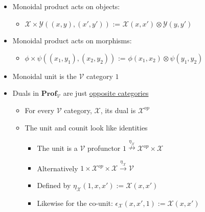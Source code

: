 \begin{itemize}
    \item Monoidal product acts on objects:
          \begin{itemize}
            \item $\mathcal{X} \times \mathcal{Y}((x,y),(x',y'))$ := $\mathcal{X}(x,x') \otimes \mathcal{Y}(y,y')$
          \end{itemize}
    \item Monoidal product acts on morphisms:
          \begin{itemize}
            \item $\phi \times \psi((x_1,y_1),(x_2,y_2))$ := $\phi(x_1,x_2)\otimes\psi(y_1,y_2)$
          \end{itemize}
    \item Monoidal unit is the $\mathcal{V}$ category $1$
    \item Duals in $\mathbf{Prof}_\mathcal{V}$ are just \href{doc/1 math/Seven Sketches in Compositionality/Chapter 2: Resource theories/4 Constructions on V-categories/2 Enriched functors/4 Exercise 2-73}{opposite categories}
          \begin{itemize}
            \item For every $\mathcal{V}$ category, $\mathcal{X}$, its dual is $\mathcal{X}^{op}$
            \item The unit and counit look like identities
                  \begin{itemize}
                    \item The unit is a $\mathcal{V}$ profunctor $1 \overset{\eta_\mathcal{X}}\nrightarrow \mathcal{X}^{op} \times \mathcal{X}$
                    \item Alternatively $1 \times \mathcal{X}^{op} \times \mathcal{X}\xrightarrow{\eta_\mathcal{X}}\mathcal{V}$
                    \item Defined by $\eta_\mathcal{X}(1,x,x'):=\mathcal{X}(x,x')$
                    \item Likewise for the co-unit: $\epsilon_\mathcal{X}(x,x',1):=\mathcal{X}(x,x')$
                  \end{itemize}
          \end{itemize}
  \end{itemize}
